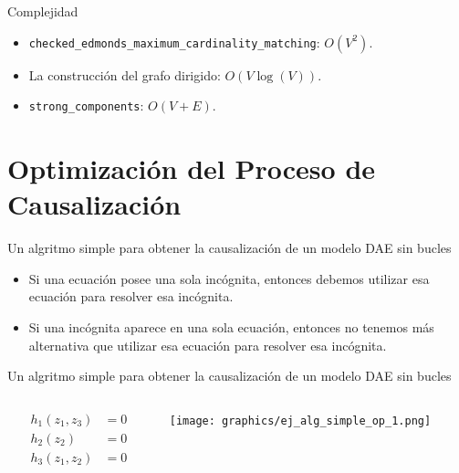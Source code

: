 \begin{frame}[fragile]{Complejidad}
    \begin{itemize}
    \item \verb+checked_edmonds_maximum_cardinality_matching+: $O(V^{2})$.
    \item La construcción del grafo dirigido: $O(V\log(V))$.
    \item \verb+strong_components+: $O(V+E)$.
    \end{itemize}
\end{frame}

\section{Optimización del Proceso de Causalización}

\begin{frame}{Un algritmo simple para obtener la causalización de un modelo DAE sin bucles}
    \begin{itemize}
        \item Si una ecuación posee una sola incógnita, entonces debemos utilizar esa ecuación para resolver esa incógnita.
        \item Si una incógnita aparece en una sola ecuación, entonces no tenemos más alternativa que utilizar esa ecuación para resolver esa incógnita.
    \end{itemize}
\end{frame}

\begin{frame}[fragile]{Un algritmo simple para obtener la causalización de un modelo DAE sin bucles}
\begin{columns}
    \begin{column}{0.5\textwidth}
        \begin{align*}
            h_{1}(z_{1},z_{3}) &=0 \\
            h_{2}(z_{2}) &=0 \\
            h_{3}(z_{1},z_{2}) &=0
        \end{align*}
    \end{column}
    \begin{column}{0.5\textwidth}
        \texttt{[image: graphics/ej\_alg\_simple\_op\_1.png]}
    \end{column}
\end{columns}
\end{frame}

